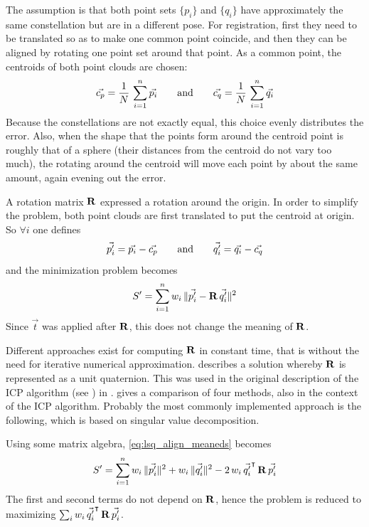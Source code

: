 The assumption is that both point sets $\{ p_i \}$ and $\{ q_i \}$ have approximately the same constellation but are in a different pose. For registration, first they need to be translated so as to make one common point coincide, and then they can be aligned by rotating one point set around that point. As a common point, the centroids of both point clouds are chosen:
\begin{equation}
\vec{c_p} = \frac{1}{N} \, \sum_{i=1}^{n} \vec{p_i}
\hspace{7mm} \text{and} \hspace{7mm}
\vec{c_q} = \frac{1}{N} \, \sum_{i=1}^{n} \vec{q_i}
\end{equation}
Because the constellations are not exactly equal, this choice evenly distributes the error. Also, when the shape that the points form around the centroid point is roughly that of a sphere (their distances from the centroid do not vary too much), the rotating around the centroid will move each point by about the same amount, again evening out the error. 

A rotation matrix $\mathbf{R}$ expressed a rotation around the origin. In order to simplify the problem, both point clouds are first translated to put the centroid at origin. So $\forall i$ one defines
\begin{equation}
\vec{p'_i} = \vec{p_i} - \vec{c_p}
\hspace{7mm} \text{and} \hspace{7mm}
\vec{q'_i} = \vec{q_i} - \vec{c_q}
\end{equation}
and the minimization problem becomes
\begin{equation} \label{eq:lsq_align_meaneds}
S' = \sum_{i=1}^{n} w_i \, \| \vec{p'_i} - \mathbf{R} \, \vec{q'_i} \|^2
\end{equation}
Since $\vec{t}$ was applied after $\mathbf{R}$, this does not change the meaning of $\mathbf{R}$.

Different approaches exist for computing $\mathbf{R}$ in constant time, that is without the need for iterative numerical approximation. \cite{Horn1986} describes a solution whereby $\mathbf{R}$ is represented as a unit quaternion. This was used in the original description of the ICP algorithm (see \label{sec:icp}) in \cite{Besl1992}. \cite{Loru1995} gives a comparison of four methods, also in the context of the ICP algorithm. Probably the most commonly implemented approach is the following, which is based on singular value decomposition.

Using some matrix algebra, \ref{eq:lsq_align_meaneds} becomes
\begin{equation}
S' = \sum_{i=1}^{n} w_i \, \| \vec{p'_i} \|^2 + w_i \, \| \vec{q'_i} \|^2 - 2 \, w_i \, \vec{q'_i}^\intercal \, \mathbf{R} \, \vec{p'_i}
\end{equation}
The first and second terms do not depend on $\mathbf{R}$, hence the problem is reduced to maximizing $\sum_{i} w_i \, \vec{q'_i}^\intercal \, \mathbf{R} \, \vec{p'_i}$.

